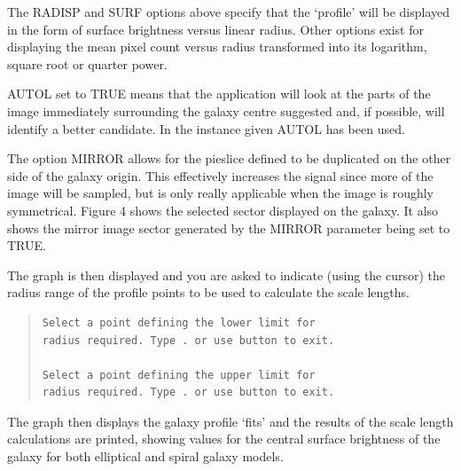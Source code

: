 \documentclass[twoside,11pt]{article}
\newenvironment{myquote}{\begin{quote}\begin{small}}{\end{small}\end{quote}}
\begin{document}
The RADISP and SURF options above specify that the `profile' will be displayed
in the form of surface brightness versus linear radius. Other options exist for
displaying the mean pixel count versus radius transformed into its
logarithm, square root or quarter power.

AUTOL set to TRUE means that the application will look at the parts of the
image immediately surrounding the galaxy centre suggested 
and, if possible, will identify a better candidate. In the instance given 
AUTOL has been used.
  
The option MIRROR allows for the pieslice
defined to be duplicated on the other side of the galaxy
origin. This effectively increases the signal since more of the image will be
sampled, but is only really applicable when the image is roughly 
symmetrical. Figure 4 shows the selected sector displayed on the galaxy. It
also shows the mirror image sector generated by the MIRROR parameter being
set to TRUE.
                    
The graph is then displayed and you are asked to indicate (using the cursor) 
the radius range of the profile points to be used to calculate the scale 
lengths.

\begin{myquote}
\begin{verbatim}
Select a point defining the lower limit for
radius required. Type . or use button to exit.
 
Select a point defining the upper limit for
radius required. Type . or use button to exit.
\end{verbatim}
\end{myquote}
 
The graph then displays the galaxy profile `fits' and the 
results of the scale length calculations are printed, showing
values for the central surface brightness of the galaxy for both elliptical 
and spiral galaxy models.
\end{document}
